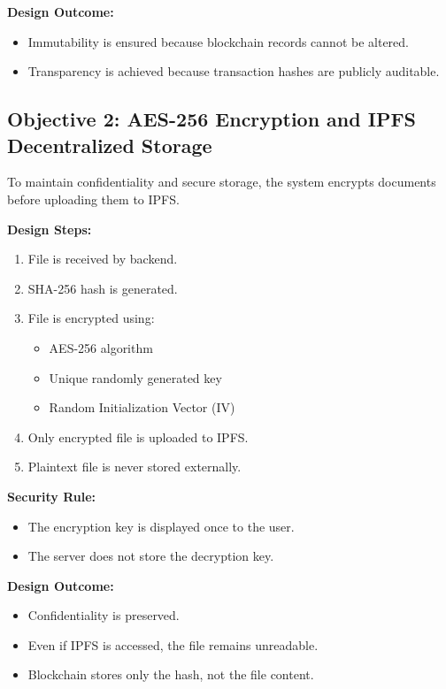 \documentclass[12pt]{article}
\begin{document}
\textbf{Design Outcome:}

\begin{itemize}
\item Immutability is ensured because blockchain records cannot be altered.
\item Transparency is achieved because transaction hashes are publicly auditable.
\end{itemize}

\subsection{Objective 2: AES-256 Encryption and IPFS Decentralized Storage}

To maintain confidentiality and secure storage, the system encrypts documents before uploading them to IPFS.

\textbf{Design Steps:}

\begin{enumerate}
\item File is received by backend.
\item SHA-256 hash is generated.
\item File is encrypted using:
\begin{itemize}
\item AES-256 algorithm
\item Unique randomly generated key
\item Random Initialization Vector (IV)
\end{itemize}
\item Only encrypted file is uploaded to IPFS.
\item Plaintext file is never stored externally.
\end{enumerate}

\textbf{Security Rule:}

\begin{itemize}
\item The encryption key is displayed once to the user.
\item The server does not store the decryption key.
\end{itemize}

\textbf{Design Outcome:}

\begin{itemize}
\item Confidentiality is preserved.
\item Even if IPFS is accessed, the file remains unreadable.
\item Blockchain stores only the hash, not the file content.
\end{itemize}
\end{document}
